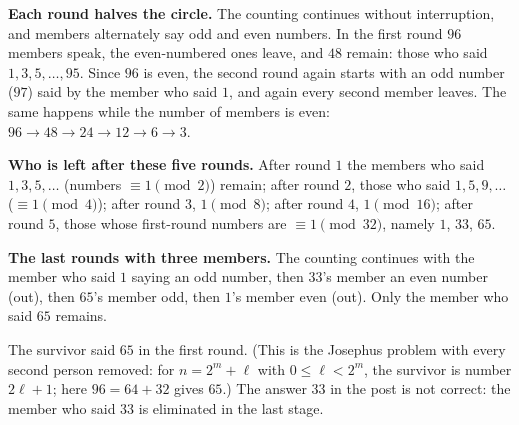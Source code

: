 \textbf{Each round halves the circle.} The counting continues without interruption, and members alternately say odd and even numbers. In the first round $96$ members speak, the even-numbered ones leave, and $48$ remain: those who said $1,3,5,\dots,95$. Since $96$ is even, the second round again starts with an odd number ($97$) said by the member who said $1$, and again every second member leaves. The same happens while the number of members is even: $96\to48\to24\to12\to6\to3$.

\textbf{Who is left after these five rounds.} After round $1$ the members who said $1,3,5,\dots$ (numbers $\equiv1\pmod2$) remain; after round $2$, those who said $1,5,9,\dots$ ($\equiv1\pmod4$); after round $3$, $1\pmod8$; after round $4$, $1\pmod{16}$; after round $5$, those whose first-round numbers are $\equiv1\pmod{32}$, namely $1$, $33$, $65$.

\textbf{The last rounds with three members.} The counting continues with the member who said $1$ saying an odd number, then $33$'s member an even number (out), then $65$'s member odd, then $1$'s member even (out). Only the member who said $65$ remains.

The survivor said $\boxed{65}$ in the first round. (This is the Josephus problem with every second person removed: for $n=2^m+\ell$ with $0\le\ell<2^m$, the survivor is number $2\ell+1$; here $96=64+32$ gives $65$.) The answer $33$ in the post is not correct: the member who said $33$ is eliminated in the last stage.
